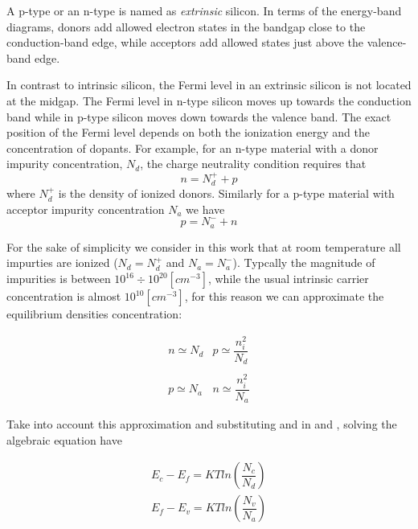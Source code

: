 A p-type or an n-type is named as \textit{extrinsic} silicon.
In terms of the energy-band diagrams, donors add allowed electron states in the bandgap close to the conduction-band edge, while acceptors add allowed states just above the valence-band edge.

In contrast to intrinsic silicon, the Fermi level in an extrinsic silicon is not located at the midgap. The Fermi level in n-type silicon moves up towards the conduction band while in p-type silicon moves down towards the valence band.
The exact position of the Fermi level depends on both the ionization energy and the concentration of dopants. For example, for an n-type material with a donor impurity concentration, $N_d$, the charge neutrality condition requires that
\begin{equation}
\label{eq: equilibrium charge in n-type}
n = N_d^+ + p
\end{equation}
 where $N_d^+$ is the density of ionized donors.  Similarly for a p-type material with acceptor impurity concentration $N_a$ we have
\begin{equation}
\label{eq: equilibrium charge in p-type}
p = N_a^- + n
\end{equation}
 
 For the sake of simplicity we consider in this work that at room temperature all impurties are ionized ($N_d = N_d^+$ and $N_a = N_a^-$). Typcally the magnitude of impurities is between $10^{16}\div 10^{20} [cm^{-3}]$, while the usual intrinsic carrier concentration is almost $10^{10}[cm^{-3}]$, for this reason we can approximate the equilibrium densities concentration:
  
\begin{equation}
\begin{array}{ll}
n \simeq N_d & p \simeq \dfrac{n_i^2}{N_d} \\ \\
p \simeq N_a & n \simeq \dfrac{n_i^2}{N_a}
\end{array}
\end{equation}

 Take into account this approximation and substituting  and  in  and , solving the algebraic equation have
 
 \begin{align}
 E_c-E_f = KTln\left(\dfrac{N_c}{N_d}\right)  \label{eq: Ef in n-type}\\
 E_f-E_v= KTln\left(\dfrac{N_v}{N_a}\right) \label{eq: Ef in p-type}
 \end{align}

